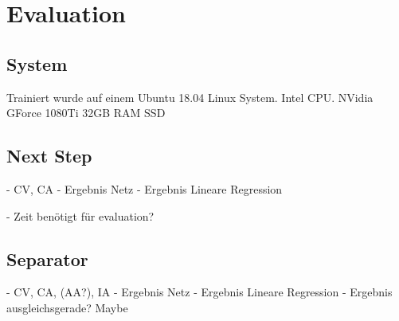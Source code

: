 \chapter{Evaluation}


\section{System}

Trainiert wurde auf einem Ubuntu 18.04 Linux System.
Intel CPU.
NVidia GForce 1080Ti
32GB RAM
SSD 


\section{Next Step}

- CV, CA
- Ergebnis Netz
- Ergebnis Lineare Regression

- Zeit benötigt für evaluation?

\section{Separator}

- CV, CA, (AA?), IA
- Ergebnis Netz
- Ergebnis Lineare Regression
- Ergebnis ausgleichsgerade? Maybe